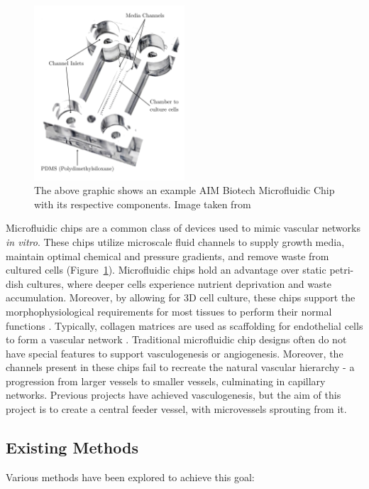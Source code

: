 \documentclass[letterpaper,12pt]{article}
\begin{document}
\begin{figure}[h]
    \centering
    \includegraphics[width=0.5\textwidth]{dapp_report/figures/aim_chip.png} %
    \caption{The above graphic shows an example AIM Biotech Microfluidic Chip with its respective components. Image taken from \cite{identx_3_chip_aim_biotech} }
    \label{fig:aim_chip}
\end{figure}

Microfluidic chips are a common class of devices used to mimic vascular networks \textit{in vitro}. These chips utilize microscale fluid channels to supply growth media, maintain optimal chemical and pressure gradients, and remove waste from cultured cells (Figure~\ref{fig:aim_chip}). Microfluidic chips hold an advantage over static petri-dish cultures, where deeper cells experience nutrient deprivation and waste accumulation. Moreover, by allowing for 3D cell culture, these chips support the morphophysiological requirements for most tissues to perform their normal functions \parencite{limongi_2022_microfluidics}. Typically, collagen matrices are used as scaffolding for endothelial cells to form a vascular network \parencite{oconnor_2022_engineering}.  Traditional microfluidic chip designs often do not have special features to support vasculogenesis or angiogenesis. Moreover, the channels present in these chips fail to recreate the natural vascular hierarchy - a progression from larger vessels to smaller vessels, culminating in capillary networks. Previous projects have achieved vasculogenesis, but the aim of this project is to create a central feeder vessel, with microvessels sprouting from it\parencite{quintard_2024_a}.  

\subsection{Existing Methods}
Various methods have been explored to achieve this goal: 
\end{document}
